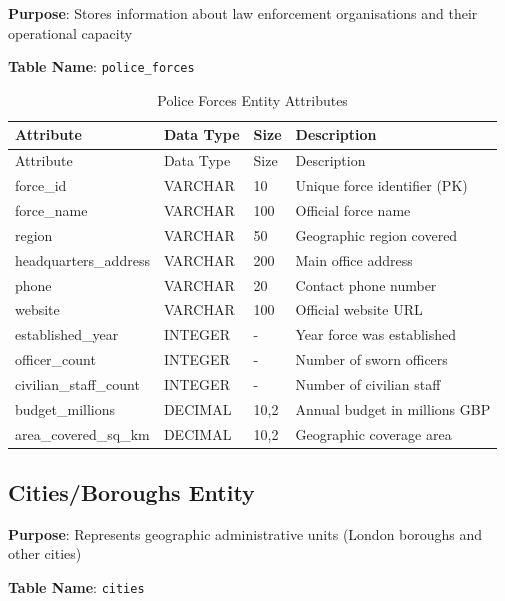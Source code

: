\documentclass[12pt,a4paper]{article}
\begin{document}
\textbf{Purpose}: Stores information about law enforcement organisations and their operational capacity

\textbf{Table Name}: \texttt{police\_forces}

\begin{longtable}{@{}lllp{6cm}@{}}
\caption{Police Forces Entity Attributes} \\
\toprule
Attribute & Data Type & Size & Description \\
\midrule
\endfirsthead
\toprule
Attribute & Data Type & Size & Description \\
\midrule
\endhead
force\_id & VARCHAR & 10 & Unique force identifier (PK) \\
force\_name & VARCHAR & 100 & Official force name \\
region & VARCHAR & 50 & Geographic region covered \\
headquarters\_address & VARCHAR & 200 & Main office address \\
phone & VARCHAR & 20 & Contact phone number \\
website & VARCHAR & 100 & Official website URL \\
established\_year & INTEGER & - & Year force was established \\
officer\_count & INTEGER & - & Number of sworn officers \\
civilian\_staff\_count & INTEGER & - & Number of civilian staff \\
budget\_millions & DECIMAL & 10,2 & Annual budget in millions GBP \\
area\_covered\_sq\_km & DECIMAL & 10,2 & Geographic coverage area \\
\bottomrule
\end{longtable}

\subsection{Cities/Boroughs Entity}

\textbf{Purpose}: Represents geographic administrative units (London boroughs and other cities)

\textbf{Table Name}: \texttt{cities}
\end{document}
